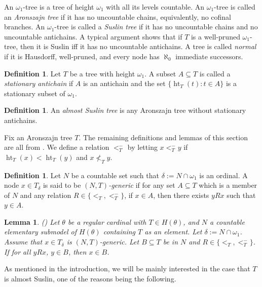 \documentclass{amsart}
\newtheorem{lemma}[theorem]{Lemma}
\theoremstyle{definition}
\newtheorem{definition}[theorem]{Definition}
\newcommand{\al}{\omega_1}
\DeclareMathOperator{\hht}{ht}
\begin{document}
An $\omega_{1}$-tree is a tree of height $\omega_{1}$ with
all its levels countable. An  $\al$-tree is called an \emph{Aronszajn
tree} if it has no uncountable chains, equivalently, no cofinal branches.
An $\al$-tree is called a \emph{Suslin tree} if it has no uncountable chains and no uncountable
antichains. A typical argument shows that if $T$ is a well-pruned
$\omega_{1}$-tree, then it is Suslin iff it has no uncountable
antichains. A tree is called \emph{normal} if it is Hausdorff,
well-pruned, and
every node has $\aleph_{0}$ immediate successors.

\begin{definition} Let $T$ be a tree with height $\omega_1$. A subset
  $A\subseteq T$ is called a \emph{stationary antichain} if $A$ is an
  antichain and the set $\{\hht_T(t): t\in A\}$ is a stationary subset
  of $\omega_1$.
\end{definition}

\begin{definition} An \emph{almost Suslin tree} is any Aronszajn tree
  without stationary antichains.
\end{definition}

Fix an Aronszajn tree $T$.
The remaining definitions and lemmas of this section are all from
\cite{Krueger2020}. We define a relation $<_{T}^-$ by letting $x
<_{T}^- y$ if $\hht_{T} (x) < \hht_{T}(y)$ and $x \not<_{T} y$.


\begin{definition} Let $N$ be a countable set such that $\delta := N
  \cap \omega_1$ is an ordinal. A node $x \in T_\delta$ is said to be
  \emph{$(N,T)$-generic} if for any set $A \subseteq T$ which is a
  member of $N$ and any relation $R\in\{<_{T},<_{T}^- \}$, if $x\in A$,
  then there exists $yRx$ such that $y \in A$.
\end{definition}

\begin{lemma}\label{lemmaMRP}{\rm (\cite[Lemma 1.4]{Krueger2020})} Let $\theta$ be a regular cardinal with
  $T \in H(\theta)$, and $N$ a countable elementary submodel of
  $H(\theta)$ containing $T$ as an element. Let $\delta := N \cap
  \omega_1$. Assume that $x \in T_\delta$ is $( N , T )$-generic. Let $B
  \subseteq T$ be in $N$ and $R \in \{ <_{T}, <_{T}^- \}$. If for all
  $y R x$, $y \in B$, then $x \in B$.
\end{lemma}

As mentioned in the introduction, we will be mainly interested in the
case that $T$ is almost Suslin, one of the reasons being the
following.
\end{document}
